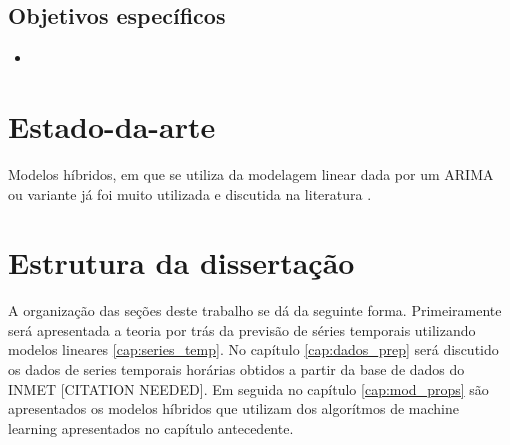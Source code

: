 \subsection{Objetivos específicos}

\begin{itemize}
    \item 
\end{itemize}

\section{Estado-da-arte}

Modelos híbridos, em que se utiliza da modelagem linear dada por um ARIMA ou variante já foi muito utilizada e discutida na literatura \cite{zhang2003time, khashei2010artificial, babu2014moving, de2014hybrid, de2016hybrid, domingos2019intelligent}.

\section{Estrutura da dissertação}

A organização das seções deste trabalho se dá da seguinte forma. Primeiramente será apresentada a teoria por trás da previsão de séries temporais utilizando modelos lineares \ref{cap:series_temp}. %
No capítulo \ref{cap:dados_prep} será discutido os dados de series temporais horárias obtidos a partir da base de dados do INMET [CITATION NEEDED]. Em seguida no capítulo \ref{cap:mod_props} são apresentados os modelos híbridos que utilizam dos algorítmos de machine learning apresentados no capítulo antecedente.